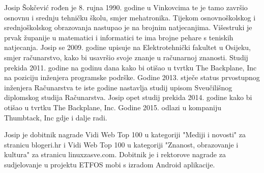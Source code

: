 \begin{biografija}
Josip Šokčević rođen je 8. rujna 1990. godine u Vinkovcima te je tamo završio osnovnu i srednju
tehničku školu, smjer mehatronika. Tijekom osnovnoškolskog i srednjoškolskog obrazovanja
nastupao je na brojnim natjecanjima. Višestruki je prvak županije u matematici i informatici te
ima brojne pehare s teniskih natjecanja. Josip se 2009. godine upisuje na Elektrotehnički fakultet
u Osijeku, smjer računarstvo, kako bi usavršio svoje znanje u računarnoj znanosti. Studij prekida
2011. godine na godinu dana kako bi otišao u tvrtku The Backplane, Inc na poziciju inženjera
programske podrške. Godine 2013. stječe status prvostupnog inženjera Računarstva te iste godine
nastavlja studij upisom Sveučilišnog diplomskog studija Računarstva. Josip opet studij prekida 2014.
godine kako bi otišao u tvrtku The Backplane, Inc. Godine 2015. odlazi u kompaniju Thumbtack, Inc
gdje i dalje radi.

Josip je dobitnik nagrade Vidi Web Top 100 u kategoriji "Mediji i novosti" za stranicu blogeri.hr i
Vidi Web Top 100 u kategoriji "Znanost, obrazovanje i kultura" za stranicu linuxzasve.com.
Dobitnik je i rektorove nagrade za sudjelovanje u projektu ETFOS mobi s izradom Android
aplikacije.

\bigskip

\bigskip

\bigskip

\hspace*{8cm}\makebox[6cm]{\hrulefill}

\hspace*{8cm}

\end{biografija}
